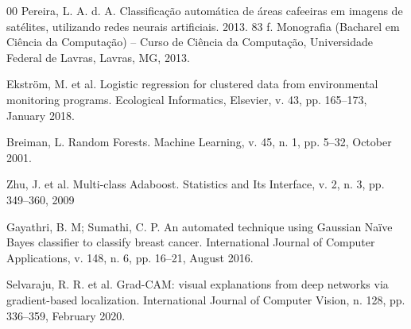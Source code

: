 \documentclass[preprint,12pt]{elsarticle}
\begin{document}
\begin{thebibliography}{00}
Pereira, L. A. d. A. Classificação automática de áreas cafeeiras em imagens de satélites, utilizando redes neurais artificiais. 2013. 83 f. Monografia (Bacharel em Ciência da Computação) – Curso de Ciência da Computação, Universidade Federal de Lavras, Lavras, MG, 2013.

Ekström, M. et al. Logistic regression for clustered data from environmental monitoring programs. Ecological Informatics, Elsevier, v. 43, pp. 165--173, January 2018.

Breiman, L. Random Forests. Machine Learning, v. 45, n. 1, pp. 5--32, October 2001.

Zhu, J. et al. Multi-class Adaboost. Statistics and Its Interface, v. 2, n. 3, pp. 349--360, 2009 

Gayathri, B. M; Sumathi, C. P. An automated technique using Gaussian Naïve Bayes classifier to classify breast cancer. International Journal of Computer Applications, v. 148, n. 6, pp. 16--21, August 2016.

Selvaraju, R. R. et al. Grad-CAM: visual explanations from deep networks via gradient-based localization. International Journal of Computer Vision, n. 128, pp. 336--359, February 2020.


\end{thebibliography}
\end{document}
